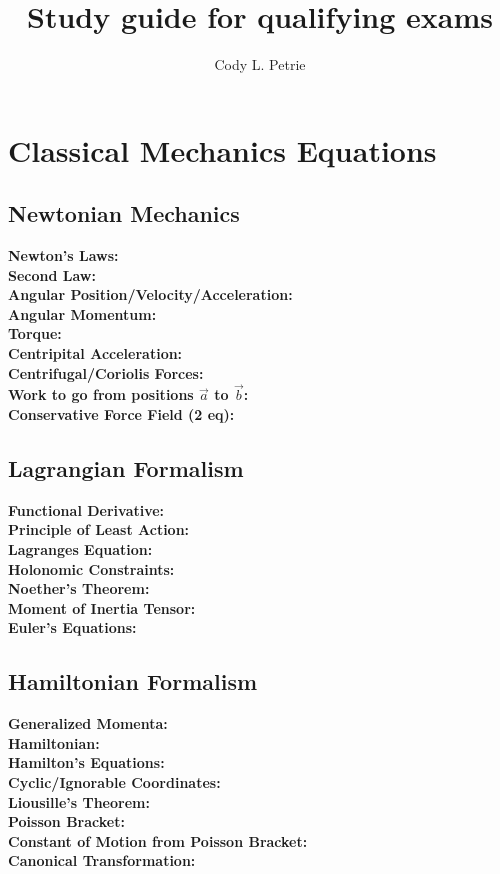 \documentclass[12pt]{extarticle}
\title{Study guide for qualifying exams}
\author{Cody L. Petrie}
\begin{document}
\maketitle

\section{Classical Mechanics Equations}
\subsection*{Newtonian Mechanics}
\textbf{Newton's Laws:} \\
\textbf{Second Law:} \\
\textbf{Angular Position/Velocity/Acceleration:} \\
\textbf{Angular Momentum:} \\
\textbf{Torque:} \\
\textbf{Centripital Acceleration: } \\
\textbf{Centrifugal/Coriolis Forces: } \\
\textbf{Work to go from positions $\vec{a}$ to $\vec{b}$:} \\
\textbf{Conservative Force Field (2 eq):} \\

\subsection*{Lagrangian Formalism}
\textbf{Functional Derivative:} \\
\textbf{Principle of Least Action:} \\
\textbf{Lagranges Equation:} \\
\textbf{Holonomic Constraints: } \\
\textbf{Noether's Theorem: } \\
\textbf{Moment of Inertia Tensor: } \\
\textbf{Euler's Equations:} \\

\subsection*{Hamiltonian Formalism}
\textbf{Generalized Momenta: } \\
\textbf{Hamiltonian: } \\
\textbf{Hamilton's Equations:} \\
\textbf{Cyclic/Ignorable Coordinates:} \\
\textbf{Liousille's Theorem: } \\
\textbf{Poisson Bracket: } \\
\textbf{Constant of Motion from Poisson Bracket: } \\
\textbf{Canonical Transformation: } \\
\end{document}
